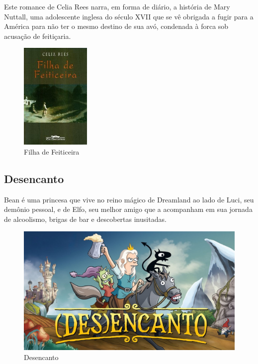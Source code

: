 Este romance de Celia Rees narra, em forma de diário, a história de Mary Nuttall, uma adolescente inglesa do século XVII que se vê obrigada a fugir para a América para não ter o mesmo destino de sua avó, condenada à forca sob acusação de feitiçaria.

\clearpage

\begin{figure}[!htb]
	\caption{\label{Filha de Feiticeira}Filha de Feiticeira}
	\begin{center}
	    \includegraphics[width=0.3\textwidth]{imagens/feiticeira.jpeg}
	\end{center}
\end{figure}



\subsection{Desencanto}

Bean é uma princesa que vive no reino mágico de Dreamland ao lado de Luci, seu demônio pessoal, e de Elfo, seu melhor amigo que a acompanham em sua jornada de alcoolismo, brigas de bar e descobertas inusitadas.



\begin{figure}[!htb]
	\caption{\label{Desencanto}Desencanto}
	\begin{center}
	    \includegraphics[width=\textwidth/2]{imagens/Desencanto.jpg}
	\end{center}
\end{figure}

